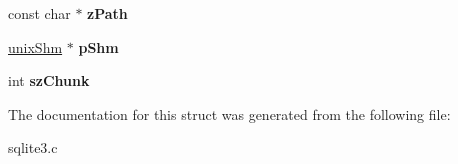 \begin{DoxyCompactItemize}
\item 
const char $\ast$ {\bfseries z\+Path}\hypertarget{structunixFile_afc5eff0948d553308cf90a79d4a06f17}{}\label{structunixFile_afc5eff0948d553308cf90a79d4a06f17}

\item 
\hyperlink{structunixShm}{unix\+Shm} $\ast$ {\bfseries p\+Shm}\hypertarget{structunixFile_a53c653bd73cdc6f518ecffe95062e91a}{}\label{structunixFile_a53c653bd73cdc6f518ecffe95062e91a}

\item 
int {\bfseries sz\+Chunk}\hypertarget{structunixFile_a5f6307d3446ce1b149df756c00c3bd2e}{}\label{structunixFile_a5f6307d3446ce1b149df756c00c3bd2e}

\end{DoxyCompactItemize}


The documentation for this struct was generated from the following file\+:\begin{DoxyCompactItemize}
\item 
sqlite3.\+c\end{DoxyCompactItemize}
